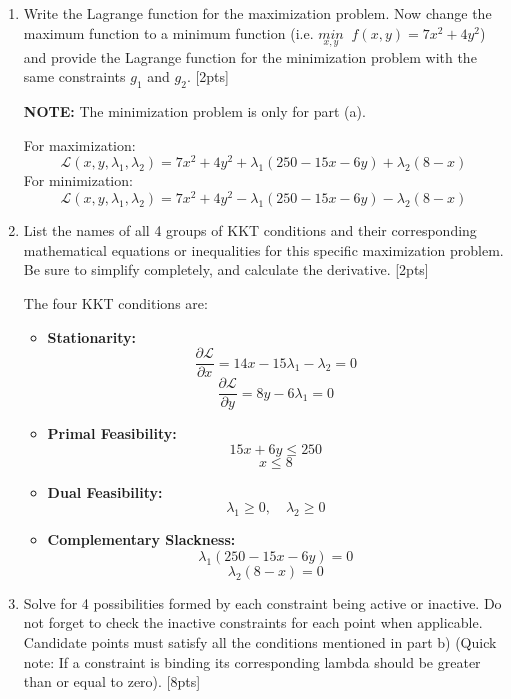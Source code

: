 \documentclass{article}
\begin{document}
\begin{enumerate}[label=(\alph*)]
    \item Write the Lagrange function for the maximization problem. Now change the maximum function to a minimum function (i.e. $\underset{x,y}{min} \;\; f(x,y) = 7x^{2} + 4y^{2}$) and provide the Lagrange function for the minimization problem with the same constraints $g_1$ and $g_2$.  [2pts]
        \par\textbf{NOTE:} The minimization problem is only for part (a).
        
    For maximization:
\[ \mathcal{L}(x, y, \lambda_1, \lambda_2) = 7x^2 + 4y^2 + \lambda_1(250 - 15x - 6y) + \lambda_2(8 - x) \]
For minimization:
\[ \mathcal{L}(x, y, \lambda_1, \lambda_2) = 7x^2 + 4y^2 - \lambda_1(250 - 15x - 6y) - \lambda_2(8 - x) \]
        
    \item List the names of all 4 groups of KKT conditions and their corresponding mathematical equations or inequalities for this specific maximization problem. Be sure to simplify completely, and calculate the derivative. [2pts]

    The four KKT conditions are:
 
\begin{itemize}
    \item \textbf{Stationarity:} \[ \frac{\partial \mathcal{L}}{\partial x} = 14x - 15\lambda_1 - \lambda_2 = 0 \]
    \[ \frac{\partial \mathcal{L}}{\partial y} = 8y - 6\lambda_1 = 0 \]
    \item \textbf{Primal Feasibility:} \[ 15x + 6y \leq 250 \]
    \[ x \leq 8 \]
    \item \textbf{Dual Feasibility:} \[ \lambda_1 \geq 0, \quad \lambda_2 \geq 0 \]
    \item \textbf{Complementary Slackness:} \[ \lambda_1(250 - 15x - 6y) = 0 \]
    \[ \lambda_2(8 - x) = 0 \]
\end{itemize}

\item Solve for 4 possibilities formed by each constraint being active or inactive. Do not forget to check the inactive constraints for each point when applicable. Candidate points must satisfy all the conditions mentioned in part b) (Quick note: If a constraint is binding its corresponding lambda should be greater than or equal to zero).   [8pts]


\end{enumerate}
\end{document}
